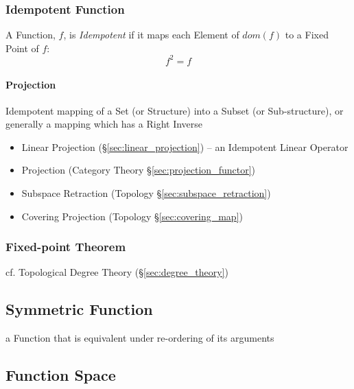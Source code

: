 \subsubsection{Idempotent Function}\label{sec:idempotent}

A Function, $f$, is \emph{Idempotent} if it maps each Element of
$dom(f)$ to a Fixed Point of $f$:
\[
  f^2 = f
\]



\paragraph{Projection}\label{sec:projection}\hfill

Idempotent mapping of a Set (or Structure) into a Subset (or Sub-structure), or
generally a mapping which has a Right Inverse

\begin{itemize}
  \item Linear Projection (\S\ref{sec:linear_projection}) -- an Idempotent
    Linear Operator
  \item Projection (Category Theory \S\ref{sec:projection_functor})
  \item Subspace Retraction (Topology \S\ref{sec:subspace_retraction})
  \item Covering Projection (Topology \S\ref{sec:covering_map})
\end{itemize}



\subsubsection{Fixed-point Theorem}\label{sec:fixedpoint_theorem}

cf. Topological Degree Theory (\S\ref{sec:degree_theory})



\subsection{Symmetric Function}\label{sec:symmetric_function}

a Function that is equivalent under re-ordering of its arguments



\subsection{Function Space}\label{sec:function_space}

